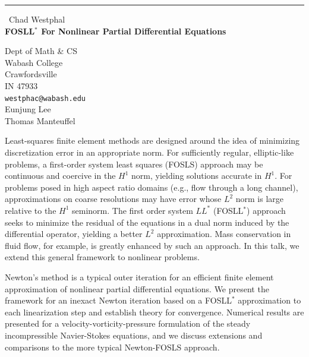 \documentclass{report}
\begin{document}
\begin{center}
\rule{6in}{1pt} \
{\large Chad Westphal \\
{\bf FOSLL$^*$ For Nonlinear Partial Differential Equations}}

Dept of Math \& CS \\ Wabash College \\ Crawfordsville \\ IN 47933
\\
{\tt westphac@wabash.edu}\\
Eunjung Lee\\
Thomas Manteuffel\end{center}

Least-squares finite element methods are designed around the idea of
minimizing discretization error in an appropriate norm. For sufficiently
regular, elliptic-like problems, a first-order system least squares
(FOSLS) approach may be continuous and coercive in the $H^1$ norm,
yielding solutions accurate in $H^1$. For problems posed in high aspect
ratio domains (e.g., flow through a long channel), approximations on
coarse resolutions may have error whose $L^2$ norm is large relative to
the $H^1$ seminorm. The first order system $LL^*$ (FOSLL$^*$) approach
seeks to minimize the residual of the equations in a dual norm induced by
the differential operator, yielding a better $L^2$ approximation. Mass
conservation in fluid flow, for example, is greatly enhanced by such an
approach. In this talk, we extend this general framework to nonlinear
problems.

Newton's method is a typical outer iteration for an efficient finite
element approximation of nonlinear partial differential equations. We
present the framework for an inexact Newton iteration based on a
FOSLL$^*$ approximation to each linearization step and establish theory
for convergence. Numerical results are presented for a
velocity-vorticity-pressure formulation of the steady incompressible
Navier-Stokes equations, and we discuss extensions and comparisons to the
more typical Newton-FOSLS approach.
\end{document}
